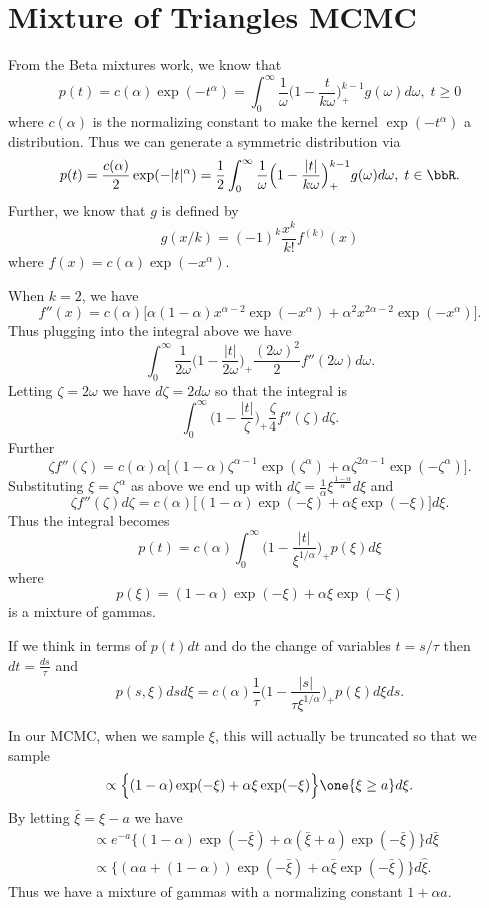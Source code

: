 \documentclass{article}
\begin{document}
\section{Mixture of Triangles MCMC}

From the Beta mixtures work, we know that
\[
p(t) = c(\alpha) \exp(-t^\alpha) = \int_0^\infty \frac{1}{\omega} \Big(1 - \frac{t}{k
  \omega}\Big)_+^{k-1} g(\omega) d\omega, \; t \geq 0
\]
where $c(\alpha)$ is the normalizing constant to make the kernel
$\exp(-t^\alpha)$ a distribution.  Thus we can generate a symmetric distribution
via
\[
p(t) = \frac{c(\alpha)}{2} \exp(-|t|^\alpha) 
= \frac{1}{2} \int_0^\infty \frac{1}{\omega} \Big(1 - \frac{|t|}{k
  \omega}\Big)_+^{k-1} g(\omega) d\omega, \; t \in \bbR.
\]
Further, we know that $g$ is defined by
\[
g(x/k) = (-1)^k \frac{x^k}{k!} f^{(k)}(x)
\]
where $f(x) = c(\alpha) \exp(-x^\alpha)$.

When $k=2$, we have 
\[
f''(x) = c(\alpha) \Big[ \alpha (1 - \alpha) x^{\alpha-2} \exp (-x^\alpha) + \alpha^2
x^{2\alpha - 2} \exp(-x^\alpha) \Big].
\]
Thus plugging into the integral above we have
\[
\int_0^\infty \frac{1}{2\omega} \Big(1 - \frac{|t|}{2 \omega}\Big)_+
\frac{(2\omega)^2}{2} f''(2 \omega) d\omega.
\]
Letting $\zeta = 2 \omega$ we have $d \zeta = 2 d \omega$ so that the integral
is
\[
\int_0^\infty \Big(1 - \frac{|t|}{\zeta}\Big)_+ \frac{\zeta}{4} f''(\zeta) d\zeta.
\]
Further
\[
\zeta f''(\zeta) = c(\alpha) \alpha \Big[ (1-\alpha) \zeta^{\alpha - 1}
\exp(\zeta^\alpha) + \alpha \zeta^{2 \alpha - 1} \exp(-\zeta^\alpha) \Big].
\]
Substituting $\xi = \zeta^\alpha$ as above we end up with $d \zeta =
\frac{1}{\alpha} \xi^{\frac{1-\alpha}{\alpha}} d \xi$ and
\[
\zeta f''(\zeta) d \zeta = c(\alpha) \Big[ (1-\alpha) \exp(-\xi) + \alpha \xi
\exp(-\xi) \Big] d \xi.
\]
Thus the integral becomes
\[
p(t) =  c(\alpha) \int_0^\infty \Big( 1 - \frac{|t|}{\xi^{1/\alpha}} \Big)_+
p(\xi) d \xi
\]
where
\[
p(\xi) = (1-\alpha) \exp(-\xi) + \alpha \xi \exp(-\xi)
\]
is a mixture of gammas.

If we think in terms of $p(t) dt$ and do the change of variables $t = s / \tau$
then $dt = \frac{ds}{\tau}$ and
\[
p(s, \xi) ds d\xi = c(\alpha) \frac{1}{\tau} \Big(1 - \frac{|s|}{\tau
  \xi^{1/\alpha}}\Big)_+ p(\xi) d \xi d s.
\]

In our MCMC, when we sample $\xi$, this will actually be truncated so that we
sample
\[
\propto \Big\{ (1-\alpha) \exp(-\xi) + \alpha \xi \exp(-\xi) \Big\} \one \{\xi
\geq a \} d\xi.
\]
By letting $\bar \xi = \xi - a$ we have
\begin{align*}
& \propto e^{-a} \Big\{(1-\alpha) \exp(
{-\bar \xi} ) + \alpha (\bar \xi + a) \exp( {-\bar \xi} )
\Big\} d \bar \xi \\
& \propto \Big\{ (\alpha a + (1-\alpha)) \exp(-\bar \xi) + \alpha \bar \xi \exp(-\bar
\xi) \Big\} d \hat \xi.
\end{align*}
Thus we have a mixture of gammas with a normalizing constant $1 + \alpha a$.
\end{document}
